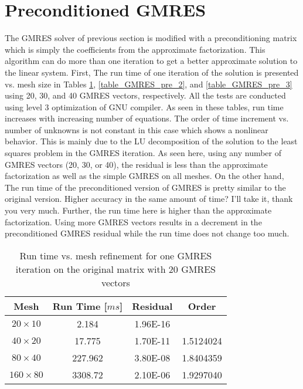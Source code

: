 \documentclass{article}
\begin{document}
\section{Preconditioned GMRES}
The GMRES solver of previous section is modified with a preconditioning matrix which is simply the coefficients from the approximate factorization. This algorithm can do more than one iteration to get a better approximate solution to the linear system. First, The run time of one iteration of the solution is presented vs. mesh size in Tables \ref{table_GMRES_pre_1}, \ref{table_GMRES_pre_2}, and \ref{table_GMRES_pre_3} using 20, 30, and 40 GMRES vectors, respectively. All the tests are conducted using level 3 optimization of GNU compiler. As seen in these tables, run time increases with increasing number of equations. The order of time increment vs. number of unknowns is not constant in this case which shows a nonlinear behavior. This is mainly due to the LU decomposition of the solution to the least squares problem in the GMRES iteration. As seen here, using any number of GMRES vectors (20, 30, or 40), the residual is less than the approximate factorization as well as the simple GMRES on all meshes. On the other hand, The run time of the preconditioned version of GMRES is pretty similar to the original version. Higher accuracy in the same amount of time? I'll take it, thank you very much. Further, the run time here is higher than the approximate factorization. Using more GMRES vectors results in a decrement in the preconditioned GMRES  residual while the run time does not change too much.

\begin{table}[H]
\centering
\caption{Run time vs. mesh refinement for one GMRES iteration on the original matrix with 20 GMRES vectors}
\label{table_GMRES_pre_1}
\begin{tabular}{cccc}
\hline
Mesh & Run Time [$m s$] & Residual & Order\\
\hline\hline
$20 \times 10$  & 2.184   & 1.96E-16 &           \\
$40 \times 20$  & 17.775  & 1.70E-11 & 1.5124024 \\
$80 \times 40$  & 227.962 & 3.80E-08 & 1.8404359 \\
$160 \times 80$ & 3308.72 & 2.10E-06 & 1.9297040 \\
\hline
\end{tabular}
\end{table}
\end{document}
